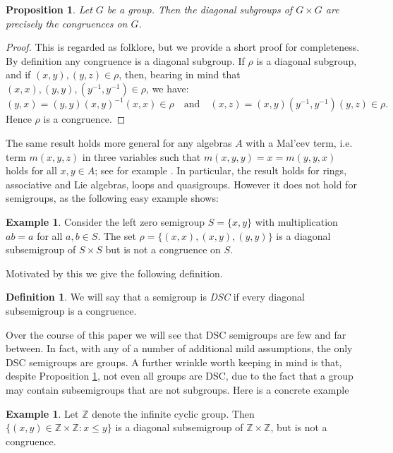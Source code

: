 \documentclass[a4paper, 12pt,reqno]{amsart}
\theoremstyle{plain}
\newtheorem{prop}[thm]{Proposition}
\theoremstyle{definition}
\newtheorem{example}[thm]{Example}
\newtheorem{definition}[thm]{Definition}
\theoremstyle{remark}
\newcommand{\Z}{\mathbb{Z}}
\begin{document}
\begin{prop}
    \label{Motivation Theorem}
    Let $G$ be a group. Then the diagonal subgroups of $G \times G$ are precisely the congruences on $G$.
\end{prop}
\begin{proof}
This is regarded as folklore, but we provide a short proof for completeness.
    By definition any congruence is a diagonal subgroup. If $\rho$ is a diagonal subgroup, and if $(x,y),(y,z) \in \rho$, then, bearing in mind that $(x,x),(y,y),(y^{-1},y^{-1})\in \rho$, we have:
    \[        (y,x)  = (y,y)(x,y)^{-1}(x,x) \in \rho \quad\text{and}\quad
        (x,z)  = (x,y)(y^{-1},y^{-1})(y,z) \in \rho.
   \]
    Hence $\rho$ is a congruence. 
\end{proof}

The same result holds more general for any algebras $A$ with a Mal'cev term, i.e. term $m(x,y,z)$ in three variables such that
$m(x,y,y)=x=m(y,y,x)$ holds for all $x,y\in A$; see for example \cite[Theorem 4.70]{MM18}.
In particular, the result holds for rings, associative and Lie algebras, loops and quasigroups.
However it does not hold for semigroups, as the following easy example shows:

\begin{example}
    Consider the left zero semigroup $S = \{ x,y \}$ with multiplication $ab = a$ for all $a,b \in S$. The set $\rho = \{ (x,x) , (x,y) , (y,y) \}$ is a diagonal subsemigroup of $S \times S$ but is not a congruence on $S$.
\end{example}

Motivated by this we give the following definition.
\begin{definition}
    \label{DSC}
    We will say that a semigroup is \textit{DSC} if every diagonal subsemigroup is a congruence.
\end{definition}

Over the course of this paper we will see that DSC semigroups are few and far between. 
In fact, with any of a number of additional mild assumptions, the only DSC semigroups are groups.
A further wrinkle worth keeping in mind is that, despite Proposition \ref{Motivation Theorem}, not even all groups are DSC, due to the fact that a group may contain subsemigroups that are not subgroups. Here is a concrete example

\begin{example}
Let $\Z$ denote the infinite cyclic group. Then $\{ (x,y) \in \Z \times \Z \colon  x \leq y \}$ 
is a diagonal subsemigroup of $\Z\times\Z$, but is not a congruence.
\end{example}
\end{document}
